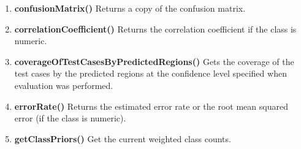 \documentclass[a4paper,12pt, english]{article}
\begin{document}
\begin{enumerate}
\item \textbf{confusionMatrix()}
          Returns a copy of the confusion matrix.
          

          

          
\item \textbf{correlationCoefficient()}
          Returns the correlation coefficient if the class is numeric.
          
\item \textbf{coverageOfTestCasesByPredictedRegions()}
          Gets the coverage of the test cases by the predicted regions at the confidence level specified when evaluation was performed.
          

          
          
          
\item \textbf{errorRate()}
          Returns the estimated error rate or the root mean squared error (if the class is numeric).

                    

\item \textbf{getClassPriors()}
          Get the current weighted class counts.
          
          

\end{enumerate}
\end{document}
